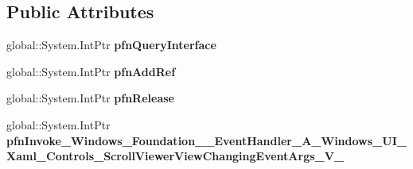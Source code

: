 \subsection*{Public Attributes}
\begin{DoxyCompactItemize}
\item 
\mbox{\label{struct_system_1_1_event_handler___a___windows___u_i___xaml___controls___scroll_viewer_view_chang628699d11d7aafe20e51b1c40740a5dc_a78e7611d52f148409e71bc8ee9409acc}} 
global\+::\+System.\+Int\+Ptr {\bfseries pfn\+Query\+Interface}
\item 
\mbox{\label{struct_system_1_1_event_handler___a___windows___u_i___xaml___controls___scroll_viewer_view_chang628699d11d7aafe20e51b1c40740a5dc_a45c4484e42a01a86102a33d3a4da9390}} 
global\+::\+System.\+Int\+Ptr {\bfseries pfn\+Add\+Ref}
\item 
\mbox{\label{struct_system_1_1_event_handler___a___windows___u_i___xaml___controls___scroll_viewer_view_chang628699d11d7aafe20e51b1c40740a5dc_aaf721d86e2ff3f67fb353a016e44ce96}} 
global\+::\+System.\+Int\+Ptr {\bfseries pfn\+Release}
\item 
\mbox{\label{struct_system_1_1_event_handler___a___windows___u_i___xaml___controls___scroll_viewer_view_chang628699d11d7aafe20e51b1c40740a5dc_a67725e73faafc6ed7738ced52e4c9be3}} 
global\+::\+System.\+Int\+Ptr {\bfseries pfn\+Invoke\+\_\+\+Windows\+\_\+\+Foundation\+\_\+\+\_\+\+Event\+Handler\+\_\+\+A\+\_\+\+Windows\+\_\+\+U\+I\+\_\+\+Xaml\+\_\+\+Controls\+\_\+\+Scroll\+Viewer\+View\+Changing\+Event\+Args\+\_\+\+V\+\_\+}
\end{DoxyCompactItemize}
